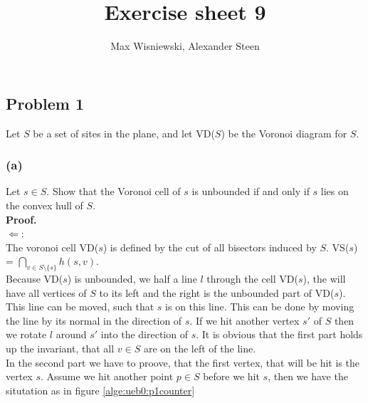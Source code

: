 \documentclass[11pt,a4paper,ngerman]{article}
\date{}
\title{Exercise sheet 9}
\author{Max Wisniewski, Alexander Steen}
\begin{document}

\renewcommand{\figurename}{Figure}

\maketitle
\thispagestyle{fancy}

\subsection*{Problem 1}

Let $S$ be a set of sites in the plane, and let VD($S$) be the Voronoi diagram
for $S$.

\subsubsection*{(a)}

Let $s \in S$. Show that the Voronoi cell of $s$ is unbounded if and only if $s$
lies on the convex hull of $S$.\\

\textbf{Proof.}\\

$\Leftarrow$:\\

The voronoi cell VD($s$) is defined by the cut of all bisectors induced by $S$.
VS($s$) = $\underset{v \in S \setminus \{ s \}}{\bigcap} h(s,v)$.\\

Because VD($s$) is unbounded, we half a line $l$ through the cell VD($s$),
the will have all vertices of $S$ to its left and the
right is the unbounded part of VD($s$). This line can be moved, such that
$s$ is on this line. This can be done by moving the line by its normal in the
direction of $s$. If we hit another vertex $s'$ of $S$ then we rotate $l$ 
around $s'$ into the direction of $s$. It is obvious that the first part holds up the invariant,
that all $v \in S$ are on the left of the line.\\

In the second part we have to proove, that the first vertex, that will be hit
is the vertex $s$. Assume we hit another point $p \in S$ before we hit $s$,
then we have the situtation as in figure \ref{alge:ueb0:p1counter}
\end{document}
